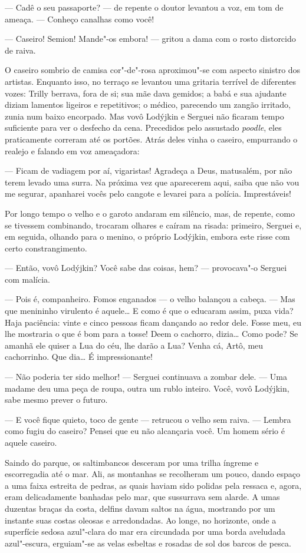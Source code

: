 --- Cadê o seu passaporte? --- de repente o doutor levantou a voz, em
tom de ameaça. --- Conheço canalhas como você!

--- Caseiro! Semion! Mande"-os embora! --- gritou a dama com o rosto
distorcido de raiva.

O caseiro sombrio de camisa cor"-de"-rosa aproximou"-se com aspecto
sinistro dos artistas. Enquanto isso, no terraço se levantou uma
gritaria terrível de diferentes vozes: Trilly berrava, fora de si; sua
mãe dava gemidos; a babá e sua ajudante diziam lamentos ligeiros e
repetitivos; o médico, parecendo um zangão irritado, zunia num baixo
encorpado. Mas vovô Lodýjkin e Serguei não ficaram tempo suficiente para
ver o desfecho da cena. Precedidos pelo assustado \emph{poodle}, eles
praticamente correram até os portões. Atrás deles vinha o caseiro,
empurrando o realejo e falando em voz ameaçadora:

--- Ficam de vadiagem por aí, vigaristas! Agradeça a Deus, matusalém,
por não terem levado uma surra. Na próxima vez que aparecerem aqui,
saiba que não vou me segurar, apanharei vocês pelo cangote e levarei para a
polícia. Imprestáveis!

Por longo tempo o velho e o garoto andaram em silêncio, mas, de
repente, como se tivessem combinando, trocaram olhares e caíram na
risada: primeiro, Serguei e, em seguida, olhando para o menino, o
próprio Lodýjkin, embora este risse com certo constrangimento.

--- Então, vovô Lodýjkin? Você sabe das coisas, hem? --- provocava"-o
Serguei com malícia.

--- Pois é, companheiro. Fomos enganados --- o velho balançou a cabeça.
--- Mas que menininho virulento é aquele\ldots{} E como é que o educaram
assim, puxa vida? Haja paciência: vinte e cinco pessoas ficam dançando
ao redor dele. Fosse meu, eu lhe mostraria o que é bom para a tosse!
Deem o cachorro, dizia\ldots{} Como pode? Se amanhã ele quiser a Lua do céu,
lhe darão a Lua? Venha cá, Artô, meu cachorrinho. Que dia\ldots{} É
impressionante!

--- Não poderia ter sido melhor! --- Serguei continuava a zombar dele.
--- Uma madame deu uma peça de roupa, outra um rublo inteiro. Você, vovô
Lodýjkin, sabe mesmo prever o futuro.

--- E você fique quieto, toco de gente --- retrucou o velho sem raiva.
--- Lembra como fugiu do caseiro? Pensei que eu não alcançaria você. Um
homem sério é aquele caseiro.

Saindo do parque, os saltimbancos desceram por uma trilha íngreme e
escorregadia até o mar. Ali, as montanhas se recolheram um pouco, dando
espaço a uma faixa estreita de pedras, as quais haviam sido polidas pela
ressaca e, agora, eram delicadamente banhadas pelo mar, que sussurrava
sem alarde. A umas duzentas braças da costa, delfins davam saltos na
água, mostrando por um instante suas costas oleosas e arredondadas. Ao
longe, no horizonte, onde a superfície sedosa azul"-clara do mar era
circundada por uma borda aveludada azul"-escura, erguiam"-se as velas
esbeltas e rosadas de sol dos barcos de pesca.


